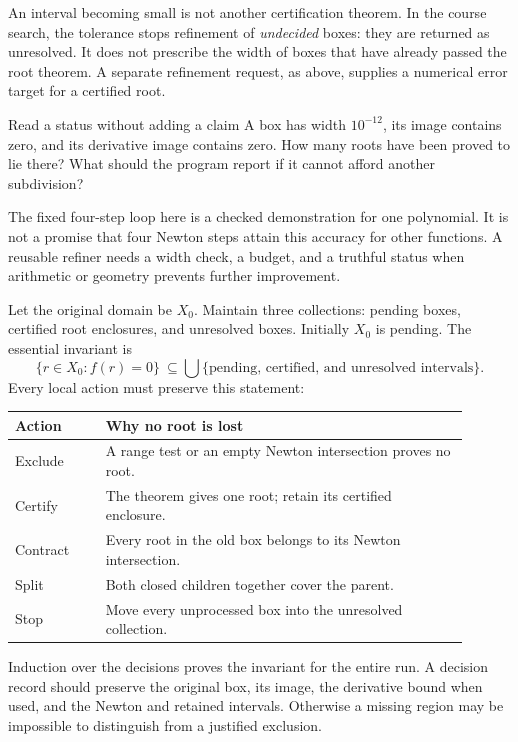 An interval becoming small is not another certification theorem. In the
course search, the tolerance stops refinement of \emph{undecided} boxes:
they are returned as unresolved. It does not prescribe the width of boxes
that have already passed the root theorem. A separate refinement request,
as above, supplies a numerical error target for a certified root.

\begin{question}{Read a status without adding a claim}
A box has width $10^{-12}$, its image contains zero, and its derivative
image contains zero. How many roots have been proved to lie there? What
should the program report if it cannot afford another subdivision?
\end{question}

The fixed four-step loop here is a checked demonstration for one polynomial.
It is not a promise that four Newton steps attain this accuracy for other
functions. A reusable refiner needs a width check, a budget, and a truthful
status when arithmetic or geometry prevents further improvement.

\newpage
{}
Let the original domain be $X_0$. Maintain three collections: pending boxes,
certified root enclosures, and unresolved boxes. Initially $X_0$ is pending.
The essential invariant is
\[
 \{r\in X_0:f(r)=0\}\ \subseteq
 \bigcup\{\text{pending, certified, and unresolved intervals}\}.
\]
Every local action must preserve this statement:
\begin{center}
\begin{tabular}{p{0.18\linewidth}p{0.72\linewidth}}
\toprule
Action & Why no root is lost\\
\midrule
Exclude & A range test or an empty Newton intersection proves no root.\\[4pt]
Certify & The theorem gives one root; retain its certified enclosure.\\[4pt]
Contract & Every root in the old box belongs to its Newton intersection.\\[4pt]
Split & Both closed children together cover the parent.\\[4pt]
Stop & Move every unprocessed box into the unresolved collection.\\
\bottomrule
\end{tabular}
\end{center}

Induction over the decisions proves the invariant for the entire run. A
decision record should preserve the original box, its image, the derivative
bound when used, and the Newton and retained intervals. Otherwise a missing
region may be impossible to distinguish from a justified exclusion.

